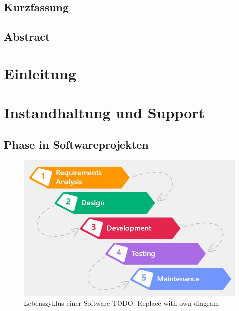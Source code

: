 \documentclass[oneside, ngerman, final, 11pt, a4paper, 1.1headlines, headinclude=false, footinclude=false, mpinclude=false, pagesize, onecolumn, titlepage, parskip=half, headsepline, chapterprefix=false, version=first, listof=totoc, bibliography=totoc, toc=graduated, fleqn, twoside=true]{scrbook}
\begin{document}
	
	\newpage{}
	
	\section*{\thispagestyle{empty}Kurzfassung}
	
	\textit{\lipsum[1-4]}
	
	\newpage{}
	
	\section*{\thispagestyle{empty}Abstract}
	
	\textit{\lipsum[1-4]}
	
	\newpage{}
	
	\setcounter{page}{1}
	
	\tableofcontents{}
	
	\newpage{}
	
	\setcounter{page}{1} 
	
	\chapter{Einleitung}
	
	
	\chapter{Instandhaltung und Support}
	
		\section{Phase in Softwareprojekten}

			\begin{figure}
				\centering
				\vspace{-\baselineskip}
				\includegraphics[width=\linewidth]{img/software-development-life-cycle.jpg}
				\caption{Lebenszyklus einer Software {\color{red}TODO: Replace with own diagram}}
				\label{fig:software-development-life-cycle}
			\end{figure}
			
\end{document}
